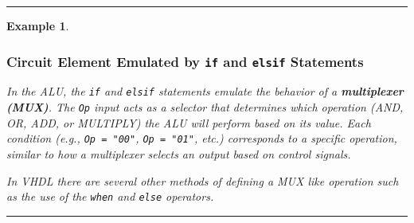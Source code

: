 \documentclass[12pt]{article}
\newtheorem{example}{Example}
\newenvironment{examp}
{
	\vspace{.5cm}
	\hrule
\begin{example}\upshape}
	{\hrule
		\vspace{0.5cm}
\end{example}}
\begin{document}
\begin{examp}

	\subsubsection*{Circuit Element Emulated by \texttt{if} and \texttt{elsif} Statements}
	In the ALU, the \texttt{if} and \texttt{elsif} statements emulate the behavior of a \textbf{multiplexer (MUX)}. The \texttt{Op} input acts as a selector that determines which operation (AND, OR, ADD, or MULTIPLY) the ALU will perform based on its value. Each condition (e.g., \texttt{Op = "00"}, \texttt{Op = "01"}, etc.) corresponds to a specific operation, similar to how a multiplexer selects an output based on control signals.
	
	In VHDL there are several other methods of defining a MUX like operation such
	as the use of the \texttt{when} and \texttt{else} operators.
\end{examp}
\end{document}
